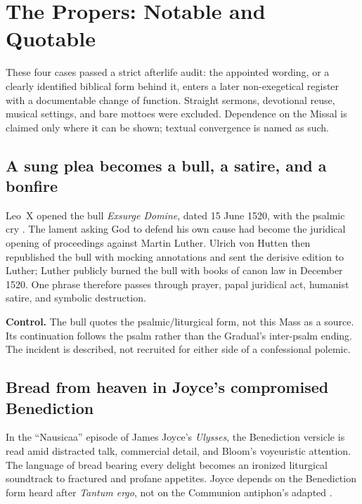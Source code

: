 \sectionguard
\section*{The Propers: Notable and Quotable}

\begin{studyframe}
These four cases passed a strict afterlife audit: the appointed wording, or a
clearly identified biblical form behind it, enters a later non-exegetical
register with a documentable change of function. Straight sermons, devotional
reuse, musical settings, and bare mottoes were excluded. Dependence on the
Missal is claimed only where it can be shown; textual convergence is named as
such.
\end{studyframe}

\subsection*{A sung plea becomes a bull, a satire, and a bonfire\enspace{}}

Leo~X opened the bull \emph{Exsurge Domine}, dated 15 June 1520, with the
psalmic cry . The lament asking
God to defend his own cause had become the juridical opening of proceedings
against Martin Luther. Ulrich von Hutten then republished the bull with mocking
annotations and sent the derisive edition to Luther; Luther publicly burned
the bull with books of canon law in December 1520. One phrase therefore passes
through prayer, papal juridical act, humanist satire, and symbolic destruction.

\textbf{Control.} The bull quotes the psalmic/liturgical form, not this Mass as
a source. Its continuation follows the psalm rather than the Gradual's
inter-psalm ending. The incident is described, not recruited for either side
of a confessional polemic.

\subsection*{Bread from heaven in Joyce's compromised Benediction\enspace{}}

In the ``Nausicaa'' episode of James Joyce's \emph{Ulysses}, the Benediction
versicle  is read amid distracted talk,
commercial detail, and Bloom's voyeuristic attention. The language of bread
bearing every delight becomes an ironized liturgical soundtrack to fractured
and profane appetites. Joyce depends on the Benediction form heard after
\emph{Tantum ergo}, not on the Communion antiphon's adapted
.

